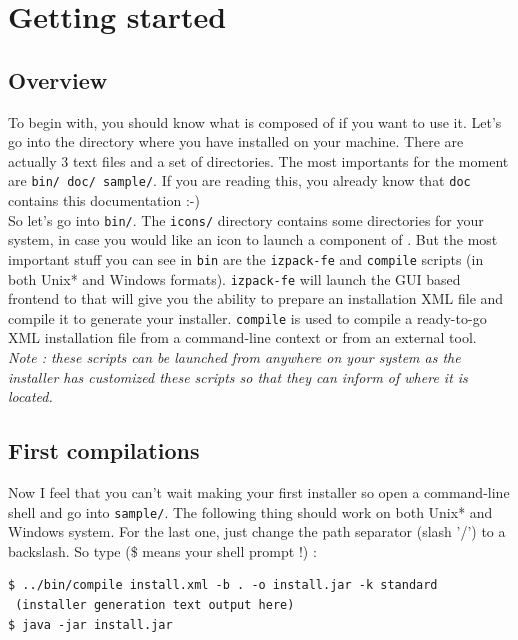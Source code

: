 \chapter{Getting started}

\section{Overview}

To begin with, you should know what \IzPack is composed of if you want to use
it. Let's go into the directory where you have installed \IzPack on your
machine. There are actually 3 text files and a set of directories. The most
importants for the moment are \texttt{bin/ doc/ sample/}. If you are reading this,
you already know that \texttt{doc} contains this documentation :-)\\

So let's go into \texttt{bin/}. The \texttt{icons/} directory contains some
directories for your system, in case you would like an icon to launch a
component of \IzPack. But the most important stuff you can see in \texttt{bin}
are the \texttt{izpack-fe} and \texttt{compile} scripts (in both Unix* and
Windows formats). \texttt{izpack-fe} will launch the GUI based frontend to
\IzPack that will give you the ability to prepare an installation XML file and
compile it to generate your installer. \texttt{compile} is used to compile a
ready-to-go XML installation file from a command-line context or from an
external tool.\\

\noindent
\textit{Note : these scripts can be launched from anywhere on your system as the
installer has customized these scripts so that they can inform \IzPack of where
it is located.}\\

\section{First compilations}

Now I feel that you can't wait making your first installer so open a
command-line shell and go into \texttt{sample/}. The following thing should work
on both Unix* and Windows system. For the last one, just change the path
separator (slash '/') to a backslash. So type (\$ means your shell prompt !) :
\begin{verbatim}
$ ../bin/compile install.xml -b . -o install.jar -k standard
 (installer generation text output here)
$ java -jar install.jar
\end{verbatim}

